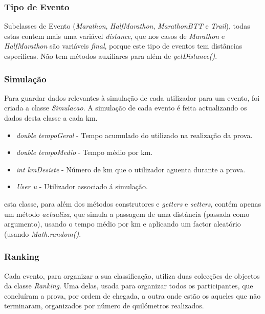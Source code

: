 \documentclass[10pt,notitlepage]{article}
\begin{document}
\subsubsection{Tipo de Evento}

Subclasses de Evento (\textit{Marathon}, \textit{HalfMarathon}, \textit{MarathonBTT} e \textit{Trail}), todas estas contem mais uma variável \textit{distance}, que nos casos de \textit{Marathon} e \textit{HalfMarathon} são variáveis \textit{final}, porque este tipo de eventos tem distâncias especificas. Não tem métodos auxiliares para além de \textit{getDistance()}.


\subsubsection{Simulação}

Para guardar dados relevantes à simulação de cada utilizador para um evento, foi criada a classe \textit{Simulacao}. A simulação de cada evento é feita actualizando os dados desta classe a cada km.
 
\begin{itemize}
\item \textit{double tempoGeral} - Tempo acumulado do utilizado na realização da prova.
\item \textit{double tempoMedio} - Tempo médio por km.
\item \textit{int kmDesiste} - Número de km que o utilizador aguenta durante a prova.
\item \textit{User u} - Utilizador associado á simulação. 
\end{itemize}
esta classe, para além dos métodos construtores e \textit{getters} e \textit{setters}, contém apenas um método \textit{actualiza}, que simula a passagem de uma distância (passada como argumento), usando o tempo médio por km e aplicando um factor aleatório (usando \textit{Math.random()}.



\subsubsection{Ranking}

Cada evento, para organizar a sua classificação, utiliza duas colecções de objectos da classe \textit{Ranking}. Uma delas, usada para organizar todos os participantes, que concluíram a prova, por ordem de chegada, a outra onde estão os aqueles que não terminaram, organizados por número de quilómetros realizados.
\end{document}
